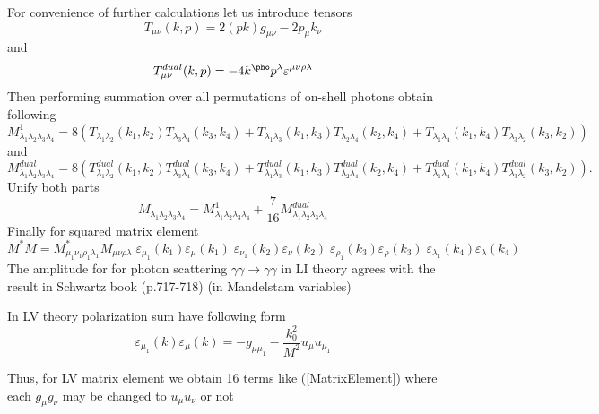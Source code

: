 \documentclass[12pt]{article}
\begin{document}
For convenience of further calculations let us introduce tensors
\begin{equation}
    T_{\mu\nu}(k,p) = 2 (pk)g_{\mu\nu} - 2 p_\mu k_\nu
\end{equation}
and
\begin{equation}
    T^{dual}_{\mu\nu}(k,p) = - 4 k^\pho p^\lambda \varepsilon^{\mu\nu\rho\lambda}
\end{equation}
Then performing summation over all permutations of on-shell photons obtain following
\begin{equation}
  M^1_{\lambda_1\lambda_2\lambda_3\lambda_4}=8(T_{\lambda_1\lambda_2}(k_1,k_2)T_{\lambda_3\lambda_4}(k_3,k_4) + T_{\lambda_1\lambda_3}(k_1,k_3)T_{\lambda_2\lambda_4}(k_2,k_4) + T_{\lambda_1\lambda_4}(k_1,k_4)T_{\lambda_3\lambda_2}(k_3,k_2) )
\end{equation}
and
\begin{equation}
  M^{dual}_{\lambda_1\lambda_2\lambda_3\lambda_4}=8(T^{dual}_{\lambda_1\lambda_2}(k_1,k_2)T^{dual}_{\lambda_3\lambda_4}(k_3,k_4) + T^{dual}_{\lambda_1\lambda_3}(k_1,k_3)T^{dual}_{\lambda_2\lambda_4}(k_2,k_4) + T^{dual}_{\lambda_1\lambda_4}(k_1,k_4)T^{dual}_{\lambda_3\lambda_2}(k_3,k_2) ).
\end{equation}
Unify both parts
\begin{equation}
  M_{\lambda_1\lambda_2\lambda_3\lambda_4}=  M^1_{\lambda_1\lambda_2\lambda_3\lambda_4} + \frac{7}{16} M^{dual}_{\lambda_1\lambda_2\lambda_3\lambda_4}
\end{equation}
Finally for squared matrix element
    \begin{equation}
        M^*M =  M^*_{\mu_1\nu_1\rho_1\lambda_1} M_{\mu\nu\rho\lambda}\; \varepsilon_\mu_1(k_1)\varepsilon_\mu(k_1) \;\varepsilon_\nu_1 (k_2) \varepsilon_\nu (k_2)\;\varepsilon_\rho_1(k_3)\varepsilon_\rho(k_3) \; \varepsilon_\lambda_1(k_4)\varepsilon_\lambda(k_4)
    \label{MatrixElement}    
    \end{equation}
The amplitude for for photon scattering $\gamma\gamma \to \gamma\gamma$ in LI theory agrees with the result in Schwartz book (p.717-718) (in Mandelstam variables)

In LV theory polarization sum have following form
\begin{equation}
     \varepsilon_\mu_1(k) \varepsilon_\mu(k) = -g_{\mu \mu_1}- \frac{k_0^2}{M^2} u_{\mu} u_{\mu_1}
\end{equation}

Thus, for LV matrix element we obtain 16 terms like (\ref{MatrixElement}) where each $g_{\mu}g_{\nu}$ may be changed to $u_\mu u_\nu$ or not
\end{document}
